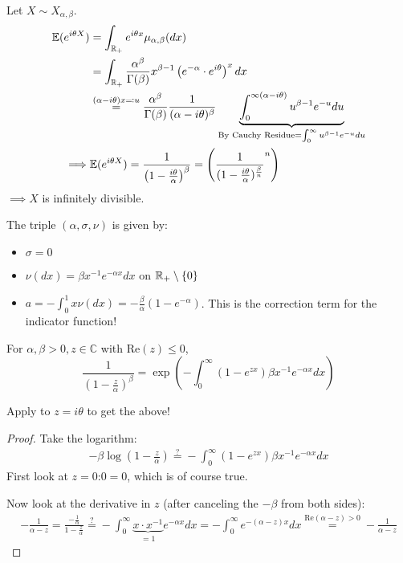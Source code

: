 Let $X\sim X_{\alpha,\beta}$.\begin{align*}
    \mathbb{E}(e^{i\theta X})&=\int_{\mathbb{R}_+} e^{i\theta x}\mu_{\alpha,\beta}(dx)\\
    &=\int_{\mathbb{R}_+} \frac{\alpha^\beta}{\Gamma(\beta)}x^{\beta-1}\left(e^{-\alpha}\cdot e^{i\theta} \right)^xdx \\
    &\stackrel{(\alpha-i\theta )x \eqqcolon u}{=}\frac{\alpha^\beta}{\Gamma(\beta)}\frac{1}{(\alpha-i\theta)^\beta}\underbrace{\int_0^{\infty(\alpha-i\theta)}u^{\beta-1} e^{-u}du}_{\text{By Cauchy Residue}=\int_0^\infty u^{\beta-1}e^{-u}du}\\
    \implies&\mathbb{E}(e^{i\theta X})=\frac{1}{\left(1-\frac{i\theta}{\alpha}\right)^\beta}=\left(\frac{1}{(1-\frac{i\theta}{\alpha})^{\frac{\beta}{n}}}^{n}\right)
\end{align*}
$\implies X$ is infinitely divisible. 

The triple $(\alpha,\sigma,\nu)$ is given by:
\begin{itemize}
    \item $\sigma=0$
    \item $\nu(dx)=\beta x^{-1}e^{-\alpha x}dx$ on $\mathbb{R}_+\setminus \{0\}$
    \item $a=-\int_0^1 x\nu(dx)=-\frac{\beta}{\alpha}(1-e^{-\alpha})$. This is the correction term for the indicator function!
\end{itemize}

\begin{lemma}\label{lem:4.6}
    For $\alpha,\beta>0,z\in \mathbb{C}$ with Re$(z)\leq 0$,
    \[\frac{1}{\left(1-\frac{z}{\alpha}\right)^\beta}=\exp\left(-\int_0^\infty (1-e^{zx})\beta x^{-1}e^{-\alpha x}dx\right)\]
\end{lemma}

Apply to $z=i\theta$ to get the above!

\begin{proof}
    Take the logarithm:
    \begin{align*}
        -\beta\log\left(1-\frac{z}{\alpha}\right) \stackrel{?}{=}-\int_0^\infty (1-e^{zx})\beta x^{-1}e^{-\alpha x}dx
    \end{align*}
    First look at $z=0$:$0=0$, which is of course true.

    Now look at the derivative in $z$ (after canceling the $-\beta$ from both  sides):
    \begin{align*}
        -\frac{1}{\alpha-z}=\frac{-\frac{1}{\alpha}}{1-\frac{z}{\alpha}}\stackrel{?}{=}-\int_0^\infty \underbrace{x \cdot x^{-1}}_{=1} e^{-\alpha x}dx = -\int_0^\infty e^{-(\alpha-z)x}dx\stackrel{\text{Re}(\alpha-z)>0}{=}-\frac{1}{\alpha-z}
    \end{align*}
\end{proof}

